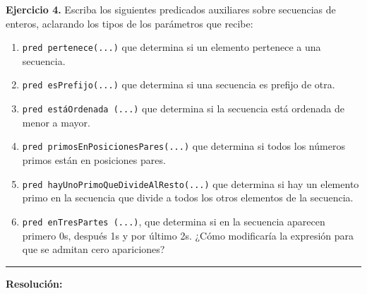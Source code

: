 \hypertarget{ej4}{}
\noindent \textbf{Ejercicio 4.} Escriba los siguientes predicados auxiliares sobre secuencias de enteros, aclarando los tipos de los parámetros que recibe:

\begin{enumerate}[label=\alph*)]
    \item \texttt{pred pertenece(...)} que determina si un elemento pertenece a una secuencia.
    \item \texttt{pred esPrefijo(...)} que determina si una secuencia es prefijo de otra.
    \item \texttt{pred estáOrdenada (...)} que determina si la secuencia está ordenada de menor a mayor.
    \item \texttt{pred primosEnPosicionesPares(...)} que determina si todos los números primos están en posiciones pares.
    \item \texttt{pred hayUnoPrimoQueDivideAlResto(...)} que determina si hay un elemento primo en la secuencia que divide a todos los otros elementos de la secuencia.
    \item \texttt{pred enTresPartes (...)}, que determina si en la secuencia aparecen primero 0s, después 1s y por último 2s. ¿Cómo modificaría la expresión para que se admitan cero apariciones?
\end{enumerate}

\vspace{0.2cm}
{\color{gray}\hrule}
\vspace{0.4cm}

\textbf{Resolución:}

